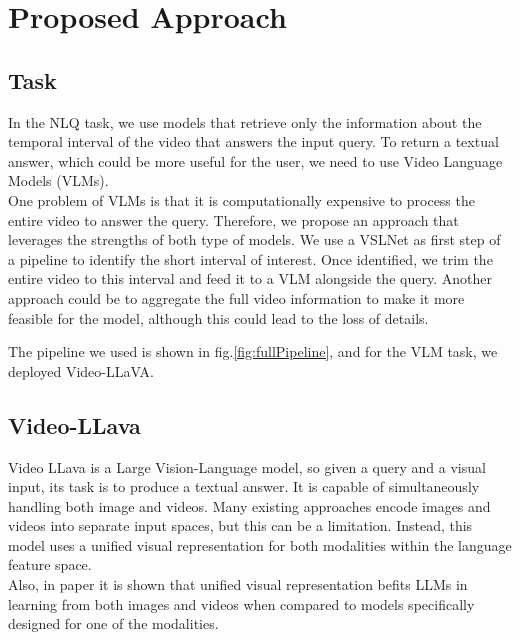 \documentclass[10pt,twocolumn,letterpaper]{article}
\begin{document}
\section{Proposed Approach}
\subsection{Task}
In the NLQ task, we use models that retrieve only the
information about the temporal interval of the video that
answers the input query. To return a textual answer,
which could be more useful for the user, we need to use
Video Language Models (VLMs).\\
One problem of VLMs is that it is computationally expensive to process the entire video to answer the query. Therefore, we propose an approach that leverages the strengths of both type of models. We use a VSLNet as first step of a pipeline to identify the short interval of interest. Once identified, we trim the entire video to this interval and feed it to a VLM alongside the query.
Another approach could be to aggregate the full video information to make it more feasible for the model, although  this could lead to the loss of details.

The pipeline we used is shown in fig.\ref{fig:fullPipeline}, and for the VLM task, we deployed Video-LLaVA.

\subsection{Video-LLava}
\label{subsec:videolava}
Video LLava is a Large Vision-Language model, so given a query and a visual input, its task is to produce a textual answer.  It is capable of simultaneously handling both image and videos. Many existing approaches encode images and videos into separate input spaces, but this can be a limitation. Instead, this model uses a unified visual representation for both modalities within the language feature space.\\
Also, in paper \cite{b8} it is shown that unified visual representation befits LLMs in learning from both images and videos when compared to models specifically designed for one of the modalities.
\end{document}
